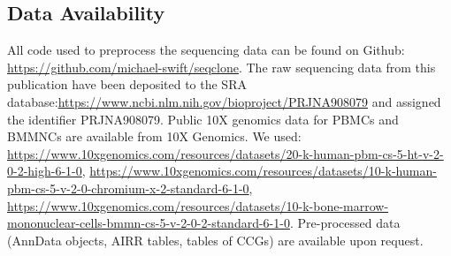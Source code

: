 \subsection{Data Availability}

All code used to preprocess the sequencing data can be found on Github: \url{https://github.com/michael-swift/seqclone}. The raw sequencing data from this publication have been deposited to the SRA database:\newline\url{https://www.ncbi.nlm.nih.gov/bioproject/PRJNA908079} and assigned the identifier PRJNA908079. Public 10X genomics data for PBMCs and BMMNCs are available from 10X Genomics. We used:\newline
\url{https://www.10xgenomics.com/resources/datasets/20-k-human-pbm-cs-5-ht-v-2-0-2-high-6-1-0}, 
\newline \url{https://www.10xgenomics.com/resources/datasets/10-k-human-pbm-cs-5-v-2-0-chromium-x-2-standard-6-1-0}, 
\newline \url{https://www.10xgenomics.com/resources/datasets/10-k-bone-marrow-mononuclear-cells-bmmn-cs-5-v-2-0-2-standard-6-1-0}. Pre-processed data (AnnData objects, AIRR tables, tables of CCGs) are available upon request.
















